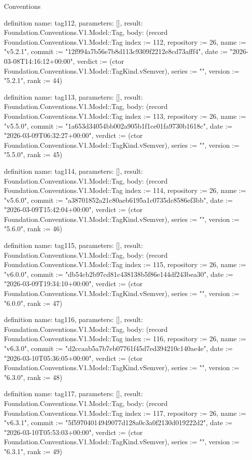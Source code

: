 \begin{lexlean}{Conventions}
\begin{semanticmodule}
definition{
  name: tag112,
  parameters: [],
  result: Foundation.Conventions.V1.Model::Tag,
  body: (record Foundation.Conventions.V1.Model::Tag {index := 112, repository := 26, name := "v5.2.1", commit := "12f994a7b56e7b8d113c9309f2212e8cd73afff4", date := "2026-03-08T14:16:12+00:00", verdict := (ctor Foundation.Conventions.V1.Model::TagKind.vSemver), series := "", version := "5.2.1", rank := 44})
}

definition{
  name: tag113,
  parameters: [],
  result: Foundation.Conventions.V1.Model::Tag,
  body: (record Foundation.Conventions.V1.Model::Tag {index := 113, repository := 26, name := "v5.5.0", commit := "1a653d34054bb002a905b1f1ce01fa9730b1618c", date := "2026-03-09T06:32:27+00:00", verdict := (ctor Foundation.Conventions.V1.Model::TagKind.vSemver), series := "", version := "5.5.0", rank := 45})
}

definition{
  name: tag114,
  parameters: [],
  result: Foundation.Conventions.V1.Model::Tag,
  body: (record Foundation.Conventions.V1.Model::Tag {index := 114, repository := 26, name := "v5.6.0", commit := "a38701852a21c80aeb6195a1c0735dc8586ef3bb", date := "2026-03-09T15:42:04+00:00", verdict := (ctor Foundation.Conventions.V1.Model::TagKind.vSemver), series := "", version := "5.6.0", rank := 46})
}

definition{
  name: tag115,
  parameters: [],
  result: Foundation.Conventions.V1.Model::Tag,
  body: (record Foundation.Conventions.V1.Model::Tag {index := 115, repository := 26, name := "v6.0.0", commit := "db54cb2b97cd81c438138b5f86e144df243bea30", date := "2026-03-09T19:34:10+00:00", verdict := (ctor Foundation.Conventions.V1.Model::TagKind.vSemver), series := "", version := "6.0.0", rank := 47})
}

definition{
  name: tag116,
  parameters: [],
  result: Foundation.Conventions.V1.Model::Tag,
  body: (record Foundation.Conventions.V1.Model::Tag {index := 116, repository := 26, name := "v6.3.0", commit := "d2ccaab5a7b7eb07761f45d7ed394210c140ae4e", date := "2026-03-10T05:36:05+00:00", verdict := (ctor Foundation.Conventions.V1.Model::TagKind.vSemver), series := "", version := "6.3.0", rank := 48})
}

definition{
  name: tag117,
  parameters: [],
  result: Foundation.Conventions.V1.Model::Tag,
  body: (record Foundation.Conventions.V1.Model::Tag {index := 117, repository := 26, name := "v6.3.1", commit := "5f59704014949077d128a0c3a0f2130d019222d2", date := "2026-03-10T05:53:03+00:00", verdict := (ctor Foundation.Conventions.V1.Model::TagKind.vSemver), series := "", version := "6.3.1", rank := 49})
}


\end{semanticmodule}
\end{lexlean}
